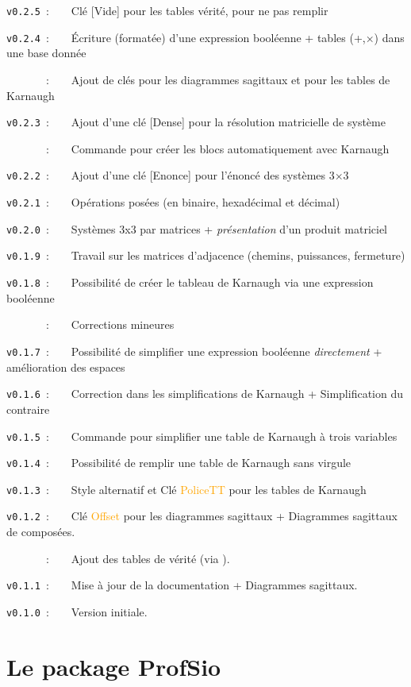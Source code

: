 \documentclass[french,a4paper,11pt]{article}
\newcommand\Cle[1]{{\small\sffamily\textlangle \textcolor{orange}{#1}\textrangle}}
\begin{document}
{{\verb|v0.2.5|~:~~~~Clé \textsf{[Vide]} pour les tables vérité, pour ne pas remplir

\verb|v0.2.4|~:~~~~Écriture (formatée) d'une expression booléenne + tables (+,×) dans une base donnée

\verb|      |~:~~~~Ajout de clés pour les diagrammes sagittaux et pour les tables de Karnaugh

\verb|v0.2.3|~:~~~~Ajout d'une clé [Dense] pour la résolution matricielle de système

\verb|      |~:~~~~Commande pour créer les blocs automatiquement avec Karnaugh

\verb|v0.2.2|~:~~~~Ajout d'une clé \textsf{[Enonce]} pour l'énoncé des systèmes 3×3

\verb|v0.2.1|~:~~~~Opérations posées (en binaire, hexadécimal et décimal)

\verb|v0.2.0|~:~~~~Systèmes 3x3 par matrices + \textit{présentation} d'un produit matriciel

\verb|v0.1.9|~:~~~~Travail sur les matrices d'adjacence (chemins, puissances, fermeture)

\verb|v0.1.8|~:~~~~Possibilité de créer le tableau de Karnaugh via une expression booléenne

\verb|      |~:~~~~Corrections mineures

\verb|v0.1.7|~:~~~~Possibilité de simplifier une expression booléenne \textit{directement} + amélioration des espaces

\verb|v0.1.6|~:~~~~Correction dans les simplifications de Karnaugh + Simplification du contraire

\verb|v0.1.5|~:~~~~Commande pour simplifier une table de Karnaugh à trois variables

\verb|v0.1.4|~:~~~~Possibilité de remplir une table de Karnaugh sans virgule

\verb|v0.1.3|~:~~~~Style alternatif et Clé \Cle{PoliceTT} pour les tables de Karnaugh

\verb|v0.1.2|~:~~~~Clé \Cle{Offset} pour les diagrammes sagittaux + Diagrammes sagittaux de composées.

\verb|      |~:~~~~Ajout des tables de vérité (via ).

\verb|v0.1.1|~:~~~~Mise à jour de la documentation + Diagrammes sagittaux.

\verb|v0.1.0|~:~~~~Version initiale.

\newpage

\section{Le package ProfSio}

}}
\end{document}

